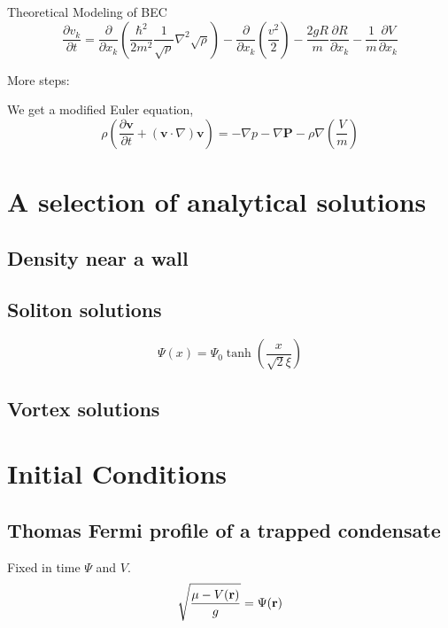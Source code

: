 \begin{chapter}{\label{cha:theoretical_model}Theoretical Modeling of BEC}
	\begin{equation*}
	\frac{\partial v_k}{\partial t} = \frac{\partial}{\partial x_k}\left(\frac{\hbar^2}{2m^2} \frac{1}{\sqrt{\rho}} \nabla^2\sqrt{\rho} \right)- \frac{\partial}{\partial x_k} \left (\frac{v^2}{2}\right) - \frac{2gR}{m}\frac{\partial R}{\partial x_k} - \frac{1}{m}\frac{\partial V}{\partial x_k}
	\end{equation*}

	More steps:

	We get a modified Euler equation,
	\begin{equation}
	\rho\left( \frac{\partial \mathbf{v}}{\partial t} + \left( \mathbf{v} \cdot \nabla \right)\mathbf{v} \right) = -\nabla p - \nabla \mathbf{P} - \rho \nabla \left(\frac{V}{m}\right)
	\end{equation}

\section{\label{section:solutions} A selection of analytical solutions}
	\subsection{\label{section:wall} Density near a wall}
	\subsection{\label{section:soliton} Soliton solutions}
		\begin{equation}
		\Psi(x) = \Psi_0 \tanh \left( \frac{x}{\sqrt{2}\xi} \right)
		\label{eq:soliton}
		\end{equation}
	\subsection{\label{section:vortices} Vortex solutions}
\section{\label{section:inital} Initial Conditions}
	\subsection{\label{section:tftrap} Thomas Fermi profile of a trapped condensate}
	Fixed in time $\Psi$ and $V$.
	\begin{equation}
	\sqrt{\frac{\mu - V({\bf r})}{g}} =  \Psi({\bf r})
	\label{eq:TF}
	\end{equation}

\end{chapter}
